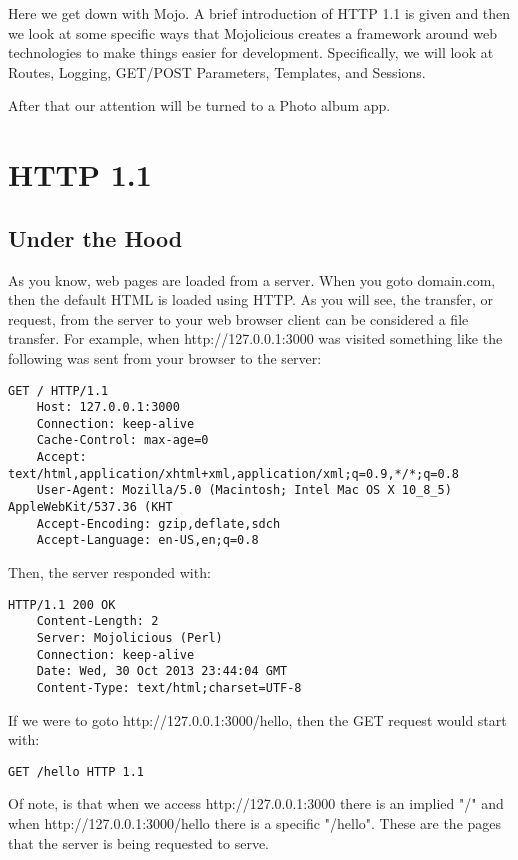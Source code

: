 \documentclass[14pt]{extreport}
\begin{document}
Here we get down with Mojo.  A brief introduction of HTTP 1.1 is given and then
we look at some specific ways that Mojolicious creates a framework around
web technologies to make things easier for development.  Specifically, we will look
at Routes, Logging, GET/POST Parameters, Templates, and Sessions.

After that our attention will be turned to a Photo album app.

\section{HTTP 1.1}

\subsection{Under the Hood}

As you know, web pages are loaded from a server. When you goto domain.com, then
the default HTML is loaded using HTTP.  As you will see, the transfer, or
request, from the server to your web browser client can be considered a file
transfer. For example, when http://127.0.0.1:3000 was visited something like
the following was sent from your browser to the server:

\begin{lstlisting}[style=BlockStyle]
    GET / HTTP/1.1
    Host: 127.0.0.1:3000
    Connection: keep-alive
    Cache-Control: max-age=0
    Accept: text/html,application/xhtml+xml,application/xml;q=0.9,*/*;q=0.8
    User-Agent: Mozilla/5.0 (Macintosh; Intel Mac OS X 10_8_5) AppleWebKit/537.36 (KHT
    Accept-Encoding: gzip,deflate,sdch
    Accept-Language: en-US,en;q=0.8
\end{lstlisting}

Then, the server responded with:

\begin{lstlisting}[style=BlockStyle]
    HTTP/1.1 200 OK
    Content-Length: 2
    Server: Mojolicious (Perl)
    Connection: keep-alive
    Date: Wed, 30 Oct 2013 23:44:04 GMT
    Content-Type: text/html;charset=UTF-8
\end{lstlisting}

If we were to goto http://127.0.0.1:3000/hello, then the GET request would
start with:

\begin{lstlisting}[style=BlockStyle]
    GET /hello HTTP 1.1
\end{lstlisting}

Of note, is that when we access http://127.0.0.1:3000 there is an implied "/"
and when http://127.0.0.1:3000/hello there is a specific "/hello".  These are
the pages that the server is being requested to serve.
\end{document}
